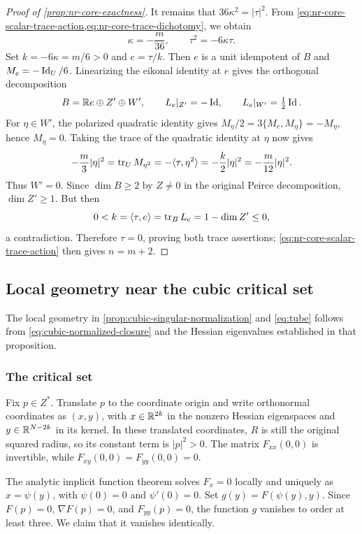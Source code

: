 \begin{proof}[Proof of \cref{prop:nr-core-exactness}]
It remains that $36\kappa^2=|\tau|^2$.
From \cref{eq:nr-core-scalar-trace-action,eq:nr-core-trace-dichotomy},
we obtain
\[
 \kappa=-\frac m{36},\qquad
 \tau^2=-6\kappa\tau.
\]
Set $k=-6\kappa=m/6>0$ and $e=\tau/k$.
Then $e$ is a unit idempotent of $B$ and $M_e=-\operatorname{Id}_U/6$.
Linearizing the eikonal identity at $e$ gives the orthogonal
decomposition
\[
 B=\mathbb R e\oplus Z'\oplus W',\qquad
 L_e|_{Z'}=-\operatorname{Id},\qquad L_e|_{W'}=\tfrac12\operatorname{Id}.
\]
For $\eta\in W'$, the polarized quadratic identity gives
$M_\eta/2=3\{M_e,M_\eta\}=-M_\eta$, hence $M_\eta=0$.
Taking the trace of the quadratic identity at $\eta$ now gives
\[
 -\frac m3|\eta|^2
 =\operatorname{tr}_U M_{\eta^2}
 =-\langle \tau,\eta^2\rangle
 =-\frac k2|\eta|^2
 =-\frac m{12}|\eta|^2.
\]
Thus $W'=0$. Since $\dim B\ge2$ by $Z\ne0$ in the original
Peirce decomposition, $\dim Z'\ge1$. But then
\[
 0<k=\langle \tau,e\rangle=\operatorname{tr}_B L_e=1-\dim Z'\le0,
\]
a contradiction.
Therefore $\tau=0$, proving both trace assertions;
\eqref{eq:nr-core-scalar-trace-action} then gives $n=m+2$.
\end{proof}

\subsection{Local geometry near the cubic critical set}
\label{sec:cubic-local-geometry}

The local geometry in \cref{prop:cubic-singular-normalization} and
\eqref{eq:tube} follows from \eqref{eq:cubic-normalized-closure}
and the Hessian eigenvalues established in that proposition.

\subsubsection{The critical set}
Fix \(p\in Z^*\).  Translate \(p\) to the coordinate origin and
write orthonormal coordinates as \((x,y)\), with
\(x\in\mathbb R^{2k}\) in the nonzero Hessian eigenspaces and
\(y\in\mathbb R^{N-2k}\) in its kernel.  In these translated coordinates,
\(R\) is still the original squared radius, so its constant term
is \(|p|^2>0\).  The matrix \(F_{xx}(0,0)\) is invertible, while
\(F_{xy}(0,0)=F_{yy}(0,0)=0\).

The analytic implicit function theorem solves \(F_x=0\) locally
and uniquely as \(x=\psi(y)\), with
\(\psi(0)=0\) and \(\psi'(0)=0\).  Set
\(g(y)=F(\psi(y),y)\).  Since \(F(p)=0\), \(\nabla F(p)=0\),
and \(F_{yy}(p)=0\), the function \(g\) vanishes to order at
least three.  We claim that it vanishes identically.

